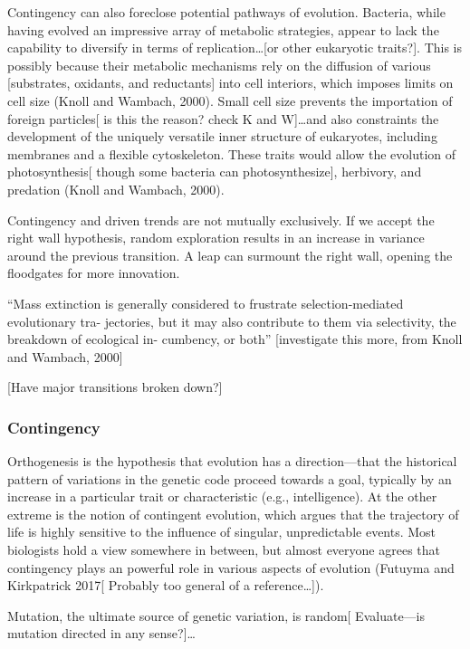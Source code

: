 \documentclass{tufte-book} %
\begin{document}
Contingency can also foreclose potential pathways of evolution. Bacteria, while having evolved an impressive array of metabolic strategies, appear to lack the capability to diversify in terms of replication…[or other eukaryotic traits?]. This is possibly because their metabolic mechanisms rely on the diffusion of various [substrates, oxidants, and reductants] into cell interiors, which imposes limits on cell size (Knoll and Wambach, 2000). Small cell size prevents the importation of foreign particles[ is this the reason? check K and W]…and also constraints the development of the uniquely versatile inner structure of eukaryotes, including membranes and a flexible cytoskeleton. These traits would allow the evolution of photosynthesis[ though some bacteria can photosynthesize], herbivory, and predation (Knoll and Wambach, 2000). 

Contingency and driven trends are not mutually exclusively. If we accept the right wall hypothesis, random exploration results in an increase in variance around the previous transition. A leap can surmount the right wall, opening the floodgates for more innovation. 

“Mass extinction is generally considered to frustrate selection-mediated evolutionary tra- jectories, but it may also contribute to them via selectivity, the breakdown of ecological in- cumbency, or both” [investigate this more, from Knoll and Wambach, 2000]



[Have major transitions broken down?]

\subsubsection{Contingency}\label{arrow:contingency}

Orthogenesis is the hypothesis that evolution has a direction—that the historical pattern of variations in the genetic code proceed towards a goal, typically by an increase in a particular trait or characteristic (e.g., intelligence). At the other extreme is the notion of contingent evolution, which argues that the trajectory of life is highly sensitive to the influence of singular, unpredictable events. Most biologists hold a view somewhere in between, but almost everyone agrees that  contingency plays an powerful role in various aspects of evolution (Futuyma and Kirkpatrick 2017[ Probably too general of a reference…]). 

Mutation, the ultimate source of genetic variation, is random[ Evaluate—is mutation directed in any sense?]…
\end{document}
